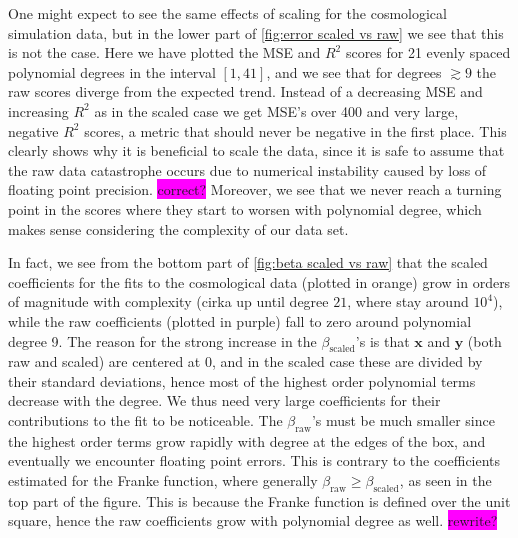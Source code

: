 \documentclass[aps,pra,english,notitlepage,reprint,nofootinbib]{revtex4-1}  %
\begin{document}
One might expect to see the same effects of scaling for the cosmological simulation data, but in the lower part of \cref{fig:error scaled vs raw} we see that this is not the case. Here we have plotted the MSE and $R^2$ scores for 21 evenly spaced polynomial degrees in the interval $[1,41]$, and we see that for degrees $\gtrsim9$ the raw scores diverge from the expected trend. Instead of a decreasing MSE and increasing $R^2$ as in the scaled case we get MSE's over 400 and very large, negative $R^2$ scores, a metric that should never be negative in the first place. This clearly shows why it is beneficial to scale the data, since it is safe to assume that the raw data catastrophe occurs due to numerical instability caused by loss of floating point precision. \colorbox{magenta}{correct?} Moreover, we see that we never reach a turning point in the scores where they start to worsen with polynomial degree, which makes sense considering the complexity of our data set.

In fact, we see from the bottom part of \cref{fig:beta scaled vs raw} that the scaled coefficients for the fits to the cosmological data (plotted in orange) grow in orders of magnitude with complexity (cirka up until degree $21$, where stay around $10^4$), while the raw coefficients (plotted in purple) fall to zero around polynomial degree 9. The reason for the strong increase in the $\beta_\text{scaled}$'s is that $\mathbf{x}$ and $\mathbf{y}$ (both raw and scaled) are centered at 0, and in the scaled case these are divided by their standard deviations, hence most of the highest order polynomial terms decrease with the degree. We thus need very large coefficients for their contributions to the fit to be noticeable. The $\beta_\text{raw}$'s must be much smaller since the highest order terms grow rapidly with degree at the edges of the box, and eventually we encounter floating point errors. This is contrary to the coefficients estimated for the Franke function, where generally $\beta_\text{raw}\geq\beta_\text{scaled}$, as seen in the top part of the figure. This is because the Franke function is defined over the unit square, hence the raw coefficients grow with polynomial degree as well. \colorbox{magenta}{rewrite?} 
\end{document}
